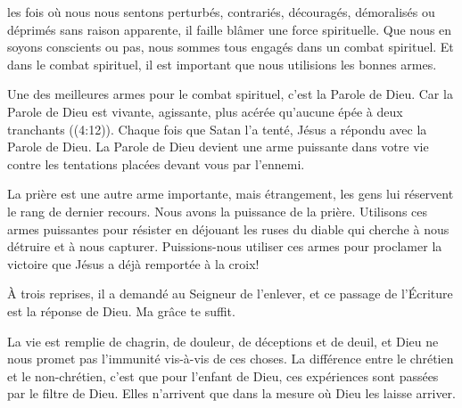  les fois où nous nous sentons perturbés, contrariés, découragés,
 démoralisés ou déprimés sans raison apparente, il faille blâmer
 une force spirituelle.
 Que nous en soyons conscients ou pas, nous sommes tous engagés
 dans un combat spirituel. Et dans le combat spirituel,
 il est important que nous utilisions les bonnes armes.

Une des meilleures armes pour le combat spirituel, c'est la Parole de Dieu.
 \og Car la Parole de Dieu est vivante, agissante, plus acérée
 qu'aucune épée à deux tranchants \fg{} ((4:12)).
 Chaque fois que Satan l'a tenté, Jésus a répondu avec la Parole de Dieu.
 La Parole de Dieu devient une arme puissante dans votre vie
 contre les tentations placées devant vous par l'ennemi.


La prière est une autre arme importante, mais étrangement,
 les gens lui réservent le rang de dernier recours.
 Nous avons la puissance de la prière. Utilisons ces armes puissantes
 pour résister en déjouant les ruses du diable qui cherche à nous détruire
 et à nous capturer.
 Puissions-nous utiliser ces armes pour proclamer la victoire
 que Jésus a déjà remportée à la croix!

\dvrule






 À trois reprises, il a demandé au Seigneur de l'enlever,
 et ce passage de l'Écriture est la réponse de Dieu.
 \og Ma grâce te suffit. \fg{}

La vie est remplie de chagrin, de douleur, de déceptions et de deuil,
 et Dieu ne nous promet pas l'immunité vis-à-vis de ces choses.
 La différence entre le chrétien et le non-chrétien,
 c'est que pour l'enfant de Dieu, ces expériences sont passées
 par le filtre de Dieu. Elles n'arrivent que dans la mesure
 où Dieu les laisse arriver.

